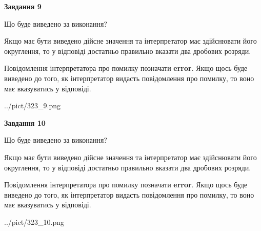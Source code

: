 \documentclass[12pt, ukrainian]{article}
\begin{document}
{\begin {Large}
{\begin {center}\textbf{Завдання 9}\end {center}}\par
Що буде виведено за виконання? \par

Якщо має бути виведено дійсне значення та інтерпретатор має здійснювати його округлення, 
то у відповіді достатньо правильно вказати два дробових розряди.

Повідомлення інтерпретатора про помилку позначати \textbf{error}.
Якщо щось буде виведено до того, як інтерпретатор видасть повідомлення про помилку, 
то воно має вказуватись у відповіді. \par

\begin{center}
	{../pict/323_9.png}
\end{center}
\newpage

{\begin {center}\textbf{Завдання 10}\end {center}}\par
Що буде виведено за виконання? \par

Якщо має бути виведено дійсне значення та інтерпретатор має здійснювати його округлення, 
то у відповіді достатньо правильно вказати два дробових розряди.

Повідомлення інтерпретатора про помилку позначати \textbf{error}.
Якщо щось буде виведено до того, як інтерпретатор видасть повідомлення про помилку, 
то воно має вказуватись у відповіді. \par

\begin{center}
	{../pict/323_10.png}
\end{center}
\newpage

\end {Large}}
\end{document}
